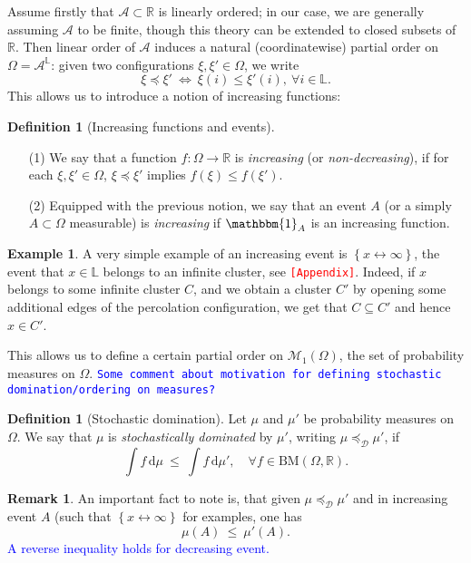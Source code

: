 \documentclass[12pt]{article}
\newcommand{\A}{\mathcal{A}}
\newcommand{\D}{\mathcal{D}}
\renewcommand{\d}{\mathrm{d}}
\renewcommand{\L}{\mathbb{L}}
\newcommand{\M}{\mathcal{M}}
\newcommand{\R}{\mathbb{R}}
\newcommand{\BM}{\mathrm{BM}}
\newcommand{\set}[1]{\left\{#1\right\}}
\newcommand{\ra}{\rightarrow}
\newcommand{\1}{\mathbbm{1}}
\newcommand{\5}{\vspace{0.5cm}}
\theoremstyle{definition}
\newtheorem{ex}[thm]{Example}
\newtheorem{df}[thm]{Definition}
\newtheorem{rem}[thm]{Remark}
\begin{document}
Assume firstly that $\A\subset\R$ is linearly ordered; in our case, we are generally assuming $\A$ to be finite, though this theory can be extended to closed subsets of $\R$. Then linear order of $\A$ induces a natural (coordinatewise) partial order on $\Omega=\A^\L$: given two configurations $\xi,\xi'\in\Omega$, we write
$$\xi\preceq\xi' ~\iff~ \xi(i)\leq\xi'(i),~\forall i\in\L.$$
This allows us to introduce a notion of increasing functions:

\begin{df}[Increasing functions and events]
~
\begin{itemize}
	\item[(1)] We say that a function $f:\Omega\ra\R$ is \textit{increasing} (or \textit{non-decreasing}), if for each $\xi,\xi'\in\Omega$, $\xi\preceq\xi'$ implies $f(\xi)\leq f(\xi')$. 
	\item[(2)] Equipped with the previous notion, we say that an event $A$ (or a simply $A\subset\Omega$ measurable) is \textit{increasing} if $\1_A$ is an increasing function.
\end{itemize}
\end{df}

\begin{ex}
A very simple example of an increasing event is $\set{x\leftrightarrow\infty}$, the event that $x\in\L$ belongs to an infinite cluster, see \textcolor{red}{\texttt{[Appendix]}}. Indeed, if $x$ belongs to some infinite cluster $C$, and we obtain a cluster $C'$ by opening some additional edges of the percolation configuration, we get that $C\subseteq C'$ and hence $x\in C'$.
\end{ex}

 This allows us to define a certain partial order on $\M_1(\Omega)$, the set of probability measures on $\Omega$. \textcolor{blue}{\texttt{Some comment about motivation for defining stochastic domination/ordering on measures?}}
 
\begin{df}[Stochastic domination]
Let $\mu$ and $\mu'$ be probability measures on $\Omega$. We say that $\mu$ is \textit{stochastically dominated} by $\mu'$, writing $\mu\preceq_\D\mu'$, if
$$\int f\,\d\mu ~\leq~ \int f\,\d\mu', \quad \forall f\in\BM(\Omega,\R).$$
\end{df}

\begin{rem}
An important fact to note is, that given $\mu\preceq_\D\mu'$ and in increasing event $A$ (such that $\set{x\leftrightarrow\infty}$ for examples, one has 
$$\mu(A) ~\leq~ \mu'(A).$$
\textcolor{blue}{A reverse inequality holds for decreasing event.}
\end{rem}
\end{document}
